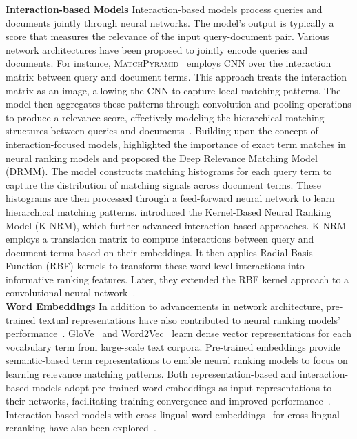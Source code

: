 \noindent \textbf{Interaction-based Models} Interaction-based models process queries and documents jointly through neural networks. 
The model's output is typically a score that measures the relevance of the input query-document pair.
Various network architectures have been proposed to jointly encode queries and documents. For instance, \textsc{MatchPyramid}~\citep{pang2016matchpyramid} employs CNN over the interaction matrix between query and document terms. This approach treats the interaction matrix as an image, allowing the CNN to capture local matching patterns. The model then aggregates these patterns through convolution and pooling operations to produce a relevance score, effectively modeling the hierarchical matching structures between queries and documents~\citep{hu2014convolutional}.
Building upon the concept of interaction-focused models, \citet{guo2016deep} highlighted the importance of exact term matches in neural ranking models and proposed the Deep Relevance Matching Model (\textsc{DRMM}). The model constructs matching histograms for each query term to capture the distribution of matching signals across document terms. 
These histograms are then processed through a feed-forward neural network to learn hierarchical matching patterns.
\citet{xiong2017knrm} introduced the Kernel-Based Neural Ranking Model (\textsc{K-NRM}), which further advanced interaction-based approaches. 
K-NRM employs a translation matrix to compute interactions between query and document terms based on their embeddings. It then applies Radial Basis Function (RBF) kernels to transform these word-level interactions into informative ranking features. Later, they extended the RBF kernel approach to a convolutional neural network~\citep{dai2018cknrm}.\\ 


\noindent \textbf{Word Embeddings} In addition to advancements in network architecture, pre-trained textual representations have also contributed to neural ranking models' performance~\citep{guo2016semantic}. GloVe~\citep{pennington-etal-2014-glove} and Word2Vec~\citep{mikolov2013efficient} learn dense vector representations for each vocabulary term from large-scale text corpora. Pre-trained embeddings provide semantic-based term representations to enable neural ranking models to focus on learning relevance matching patterns. Both representation-based and interaction-based models adopt pre-trained word embeddings as input representations to their networks, facilitating training convergence and improved performance~\citep{levy-etal-2015-improving}. Interaction-based models with cross-lingual word embeddings~\citep{joulin2018loss} for cross-lingual reranking have also been explored~\citep{yu2020study}.\\

